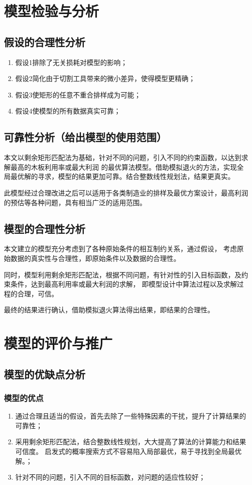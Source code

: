 \documentclass[hyperref,UTF8]{article}
\begin{document}
{\section{模型检验与分析}
\subsection{假设的合理性分析}
\begin{enumerate}
\item 假设1排除了无关损耗对模型的影响；
\item 假设2简化由于切割工具带来的微小差异，使得模型更精确；
\item 假设3使矩形的任意不重合排样成为可能；
\item 假设4使模型的所有数据真实可靠；
\end{enumerate}
\subsection{可靠性分析（给出模型的使用范围）}
本文以剩余矩形匹配法为基础，针对不同的问题，引入不同的约束函数，以达到求解最高的木板利用率或最大利润
的最优算法模型。借助模拟退火的方法，实现全局最优解的寻求，模型的结果更加可靠。结合整数线性规划法，结果更真实。

此模型经过合理改进之后可以适用于各类制造业的排样及最优方案设计，最高利润的预估等各种问题，具有相当广泛的适用范围。

\subsection{模型的合理性分析}
本文建立的模型充分考虑到了各种原始条件的相互制约关系，通过假设，
考虑原始数据的真实性与合理性，即原始条件以及数据的合理性。

同时，模型利用剩余矩形匹配法，根据不同问题，有针对性的引入目标函数，及约束条件，达到最高利用率或最大利润的求解，
即模型设计中算法过程以及求解过程的合理，可信。

最终的结果进行确认，借助模拟退火算法得出结果，即结果的合理性。




\section{模型的评价与推广}
\subsection{模型的优缺点分析}
\subsubsection{模型的优点}
\begin{enumerate}
\item 通过合理且适当的假设，首先去除了一些特殊因素的干扰，提升了计算结果的可靠性；
\item 采用剩余矩形匹配法，结合整数线性规划，大大提高了算法的计算能力和结果可信度。
启发式的概率搜索方式不容易陷入局部最优，易于寻找到全局最优解。；
\item 针对不同的问题，引入不同的目标函数，对问题的适应性较好；
\end{enumerate}
}
\end{document}
